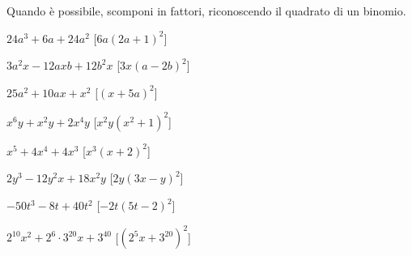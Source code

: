 \begin{esercizio}[\Ast]
\label{ese:div.021}
Quando è possibile, scomponi in fattori, riconoscendo il quadrato di un 
binomio.
\begin{multicols}{2}
\begin{enumeratea}
 \item $24a^{3}+6a+24a^{2}$ \hfill [$6a(2a+1)^{2}$]
 \item $3a^{2}x-12axb+12b^{2}x$ \hfill [$3x(a-2b)^{2}$]
 \item $25a^{2}+10ax+x^{2}$ \hfill [$(x+5a)^{2}$]
 \item $x^{6}y+x^{2}y+2x^{4}y$ \hfill [$x^{2}y\left(x^{2}+1\right)^{2}$]
 \item $x^{5}+4x^{4}+4x^{3}$ \hfill [$x^{3}(x+2)^{2}$]
 \item $2y^{3}-12y^{2}x+18x^{2}y$ \hfill [$2y(3x-y)^{2}$]
 \item $-50t^{3}-8t+40t^{2}$ \hfill [$-2t(5t-2)^{2}$]
 \item $2^{10}x^{2}+2^{6}\cdot 3^{20}x+3^{40}$ 
  \hfill [$\left(2^{5}x+3^{20}\right)^{2}$]
\end{enumeratea}
\end{multicols}
\end{esercizio}


\newpage %

\paragraph*{}

